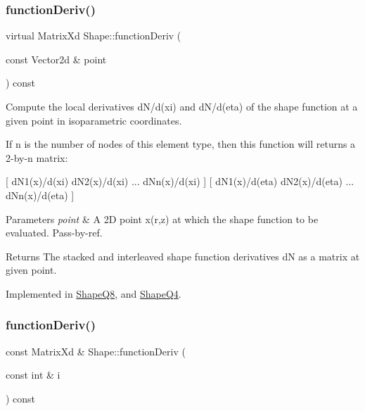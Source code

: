 \subsubsection{\texorpdfstring{function\+Deriv()}{functionDeriv()}\hspace{0.1cm}{\footnotesize\ttfamily [1/2]}}
{\footnotesize\ttfamily virtual Matrix\+Xd Shape\+::function\+Deriv (\begin{DoxyParamCaption}\item[{const Vector2d \&}]{point }\end{DoxyParamCaption}) const\hspace{0.3cm}{\ttfamily [pure virtual]}}



Compute the local derivatives d\+N/d(xi) and d\+N/d(eta) of the shape function at a given point in isoparametric coordinates. 

If n is the number of nodes of this element type, then this function will returns a 2-\/by-\/n matrix\+:

\mbox{[} d\+N1(x)/d(xi) d\+N2(x)/d(xi) ... d\+Nn(x)/d(xi) \mbox{]} \mbox{[} d\+N1(x)/d(eta) d\+N2(x)/d(eta) ... d\+Nn(x)/d(eta) \mbox{]}


\begin{DoxyParams}{Parameters}
{\em point} & A 2D point x(r,z) at which the shape function to be evaluated. Pass-\/by-\/ref. \\
\hline
\end{DoxyParams}
\begin{DoxyReturn}{Returns}
The stacked and interleaved shape function derivatives dN as a matrix at given point. 
\end{DoxyReturn}


Implemented in \mbox{\hyperlink{class_shape_q8_a49ab65aee22c0b8df4b9cb24b973a882}{Shape\+Q8}}, and \mbox{\hyperlink{class_shape_q4_a23e45399e8867f74c47eb41a30328e3e}{Shape\+Q4}}.

\mbox{\label{class_shape_abb3d4512095e82bcaf821385e1952336}} 
\subsubsection{\texorpdfstring{function\+Deriv()}{functionDeriv()}\hspace{0.1cm}{\footnotesize\ttfamily [2/2]}}
{\footnotesize\ttfamily const Matrix\+Xd \& Shape\+::function\+Deriv (\begin{DoxyParamCaption}\item[{const int \&}]{i }\end{DoxyParamCaption}) const}




